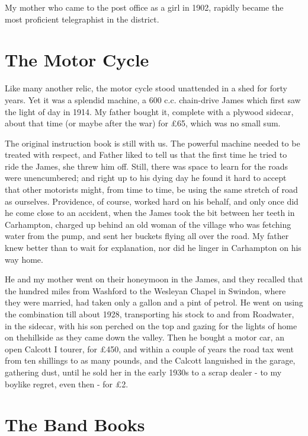 My mother who came to the post office as a girl in 1902, rapidly became the most proficient telegraphist in the district.
 
\section{The Motor Cycle}

Like many another relic, the motor cycle stood unattended in a shed for forty years. Yet it was a splendid machine, a 600 c.c. chain-drive James which first saw the light of day in 1914. My father bought it, complete with a plywood sidecar, about that time (or maybe after the war) for £65, which was no small sum.

The original instruction book is still with us. The powerful machine needed to be treated with respect, and Father liked to tell us that the first time he tried to ride the James, she threw him off. Still, there was space to learn for the roads were unencumbered; and right up to his dying day he found it hard to accept that other motorists might, from time to time, be using the same stretch of road as ourselves. Providence, of course, worked hard on his behalf, and only once did he come close to an accident, when the James took the bit between her teeth in Carhampton, charged up behind an old woman of the village who was fetching water from the pump, and sent her buckets flying all over the road. My father knew better than to wait for explanation, nor did he linger in Carhampton on his way home. 

He and my mother went on their honeymoon in the James, and they recalled that the hundred miles from Washford to the Wesleyan Chapel in Swindon, where they were married, had taken only a gallon and a pint of petrol. He went on using the combination till about 1928, transporting his stock to and from Roadwater, in the sidecar, with his son perched on the top and gazing for the lights of home on thehillside as they came down the valley. Then he bought a motor car, an open Calcott I tourer, for £450, and within a couple of years the road tax went from ten shillings to as many pounds, and the Calcott languished in the garage, gathering dust, until he sold her in the early 1930s to a scrap dealer - to my boylike regret, even then - for £2.
 
\section{The Band Books}

